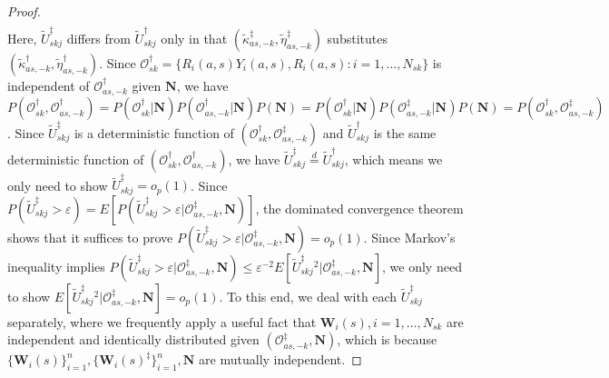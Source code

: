 \documentclass[12pt]{article}
\newcommand{\bW}{\boldsymbol{W}}
\newcommand{\bN}{\boldsymbol{N}}
\begin{document}
\begin{proof}
\begin{align*}
\end{align*}
Here, $\widetilde{U}_{skj}^\ddagger$ differs from $\widetilde{U}_{skj}^\dagger$ only in that $(\widetilde{\kappa}_{as,-k}^\ddagger, \widetilde{\eta}_{as,-k}^\ddagger)$ substitutes $(\widetilde{\kappa}_{as,-k}^\dagger, \widetilde{\eta}_{as,-k}^\dagger)$. Since $\mathcal{O}_{sk}^\dagger = \{R_i(a,s)Y_i(a,s), R_i(a,s): i=1,\dots, N_{sk}\}$ is independent of $\mathcal{O}_{as,-k}^\dagger$ given $\bN$, we have $P(\mathcal{O}_{sk}^\dagger, \mathcal{O}_{as,-k}^\dagger) = P(\mathcal{O}_{sk}^\dagger|\bN)P(\mathcal{O}_{as,-k}^\dagger|\bN)P(\bN) = P(\mathcal{O}_{sk}^\dagger|\bN)P(\mathcal{O}_{as,-k}^\ddagger|\bN)P(\bN) = P(\mathcal{O}_{sk}^\dagger, \mathcal{O}_{as,-k}^\ddagger)$. Since $\widetilde{U}_{skj}^\ddagger$ is a deterministic function of $(\mathcal{O}_{sk}^\dagger, \mathcal{O}_{as,-k}^\ddagger)$ and $\widetilde{U}_{skj}^\dagger$ is the same deterministic function of $(\mathcal{O}_{sk}^\dagger, \mathcal{O}_{as,-k}^\dagger)$, we have $\widetilde{U}_{skj}^\ddagger \overset{d}{=} \widetilde{U}_{skj}^\dagger$, which means we only need to show $\widetilde{U}_{skj}^\ddagger = o_p(1)$.
Since $P(\widetilde{U}_{skj}^\ddagger > \varepsilon) = E[P(\widetilde{U}_{skj}^\ddagger > \varepsilon|\mathcal{O}_{as,-k}^\ddagger, \bN)]$, the dominated convergence theorem shows that it suffices to prove $P(\widetilde{U}_{skj}^\ddagger > \varepsilon|\mathcal{O}_{as,-k}^\ddagger, \bN) = o_p(1)$. Since Markov's inequality implies $P(\widetilde{U}_{skj}^\ddagger > \varepsilon|\mathcal{O}_{as,-k}^\ddagger, \bN) \le \varepsilon^{-2}E[\widetilde{U}_{skj}^\ddagger{}^2|\mathcal{O}_{as,-k}^\ddagger, \bN]$, we only need to show $E[\widetilde{U}_{skj}^\ddagger{}^2|\mathcal{O}_{as,-k}^\ddagger,\bN] = o_p(1)$. To this end, we deal with each $\widetilde{U}_{skj}^\ddagger$ separately, where we frequently apply a useful fact that $\bW_i(s), i=1,\dots, N_{sk}$ are independent and identically distributed given $(\mathcal{O}_{as,-k}^\ddagger,\bN)$, which is because $\{\bW_i(s)\}_{i=1}^n, \{\bW_i(s)^\ddagger\}_{i=1}^n, \bN$ are mutually independent. 


\end{proof}
\end{document}
